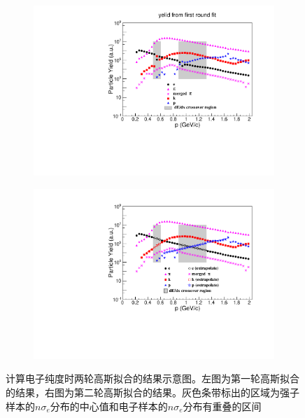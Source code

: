 \begin{figure}[h!]
    \centering
    \begin{subfigure}[h!]{0.43\textwidth}
            \includegraphics[width=\textwidth]{figures/Chapter4/Fit_Interpolate_ConstValue_FirstRound.pdf}
            \caption{}
            \label{fig:Fit_Interpolate_ConstValue_FirstRound}
    \end{subfigure}
    \begin{subfigure}[h!]{0.43\textwidth}
            \includegraphics[width=\textwidth]{figures/Chapter4/Fit_Interpolate_ConstValue.pdf}
            \caption{}
            \label{fig:Fit_Interpolate_ConstValue}
    \end{subfigure}
    \caption[计算电子纯度时两轮高斯拟合的结果示意图]{计算电子纯度时两轮高斯拟合的结果示意图。左图为第一轮高斯拟合的结果，右图为第二轮高斯拟合的结果。灰色条带标出的区域为强子样本的$n\sigma_{e}$分布的中心值和电子样本的$n\sigma_{e}$分布有重叠的区间}
    \label{fig:Multi-Gaussian_result}
\end{figure}

